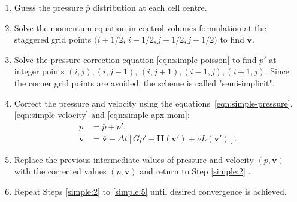 \documentclass{article}
\begin{document}
\begin{enumerate}
	\item \label{simple:1} Guess the pressure $\bar{p}$ distribution at each cell centre.
	\item \label{simple:2} Solve the momentum equation in control volumes formulation at the staggered grid points $(i+1 / 2$, $i-1 / 2, j+1 / 2, j-1 / 2)$ to find $\boldsymbol{\bar v}$.
	\item \label{simple:3} Solve the pressure correction equation \eqref{eqn:simple-poisson} to find $p'$ at integer points $(i, j),(i, j-1)$, $(i, j+1),(i-1, j),(i+1, j)$. Since the corner grid points are avoided, the scheme is called "semi-implicit".
	\item \label{simple:4} Correct the pressure and velocity using the equations~\eqref{eqn:simple-pressure},\eqref{eqn:simple-velocity} and \eqref{eqn:simple-apx-mom}:
		\begin{equation}
			\begin{aligned}
				p&=\bar p + p',\\
				\boldsymbol{v}&=\boldsymbol{\bar v}-\Delta t\left[Gp'-\mathbf{H}(\boldsymbol{v}')+\nu L(\boldsymbol{v}')\right].
			\end{aligned}
		\end{equation}
	\item \label{simple:5} Replace the previous intermediate values of pressure and velocity $\left(\bar{p}, \boldsymbol{\bar{v}}\right)$ with the corrected values $\left(p, \boldsymbol{v}\right)$ and return to Step \ref{simple:2} .
	\item \label{simple:6} Repeat Steps \ref{simple:2} to \ref{simple:5} until desired convergence is achieved.
\end{enumerate}
\end{document}
